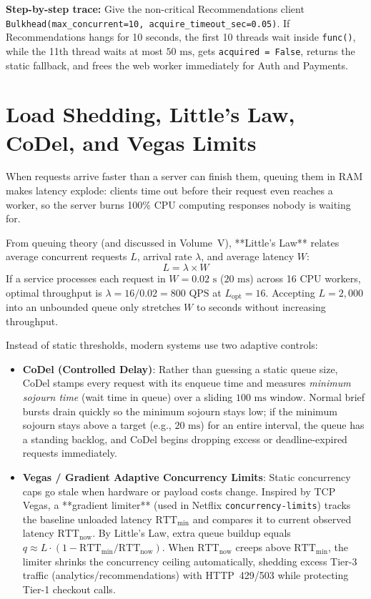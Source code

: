\textbf{Step-by-step trace:} Give the non-critical Recommendations client \texttt{Bulkhead(max\_concurrent=10, acquire\_timeout\_sec=0.05)}. If Recommendations hangs for 10 seconds, the first 10 threads wait inside \texttt{func()}, while the 11th thread waits at most $50\text{ ms}$, gets \texttt{acquired = False}, returns the static fallback, and frees the web worker immediately for Auth and Payments.

\section{Load Shedding, Little's Law, CoDel, and Vegas Limits}

When requests arrive faster than a server can finish them, queuing them in RAM makes latency explode: clients time out before their request even reaches a worker, so the server burns 100\% CPU computing responses nobody is waiting for.

From queuing theory (and discussed in Volume~V), **Little's Law** relates average concurrent requests $L$, arrival rate $\lambda$, and average latency $W$:
\begin{equation}
L = \lambda \times W
\end{equation}
If a service processes each request in $W = 0.02\text{ s}$ ($20\text{ ms}$) across 16 CPU workers, optimal throughput is $\lambda = 16 / 0.02 = 800\text{ QPS}$ at $L_{\text{opt}} = 16$. Accepting $L = 2{,}000$ into an unbounded queue only stretches $W$ to seconds without increasing throughput.

Instead of static thresholds, modern systems use two adaptive controls:
\begin{itemize}[leftmargin=18pt]
  \item \textbf{CoDel (Controlled Delay)}: Rather than guessing a static queue size, CoDel stamps every request with its enqueue time and measures \emph{minimum sojourn time} (wait time in queue) over a sliding $100\text{ ms}$ window. Normal brief bursts drain quickly so the minimum sojourn stays low; if the minimum sojourn stays above a target (e.g., $20\text{ ms}$) for an entire interval, the queue has a standing backlog, and CoDel begins dropping excess or deadline-expired requests immediately.
  \item \textbf{Vegas / Gradient Adaptive Concurrency Limits}: Static concurrency caps go stale when hardware or payload costs change. Inspired by TCP Vegas, a **gradient limiter** (used in Netflix \texttt{concurrency-limits}) tracks the baseline unloaded latency $\text{RTT}_{\min}$ and compares it to current observed latency $\text{RTT}_{\text{now}}$. By Little's Law, extra queue buildup equals $q \approx L \cdot (1 - \text{RTT}_{\min}/\text{RTT}_{\text{now}})$. When $\text{RTT}_{\text{now}}$ creeps above $\text{RTT}_{\min}$, the limiter shrinks the concurrency ceiling automatically, shedding excess Tier-3 traffic (analytics/recommendations) with HTTP~429/503 while protecting Tier-1 checkout calls.
\end{itemize}

